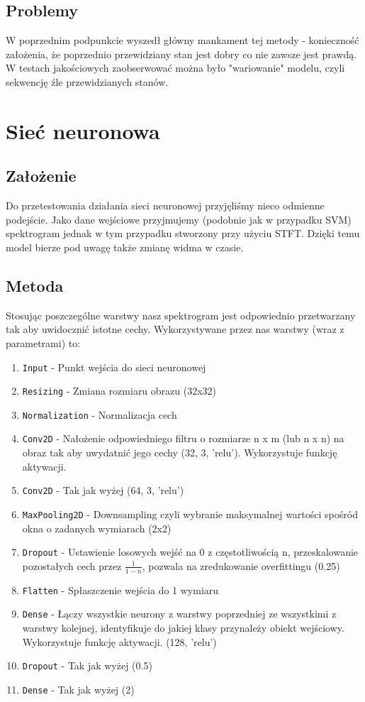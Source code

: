 \documentclass[polish]{article}
\begin{document}
\subsection{Problemy}
W poprzednim podpunkcie wyszedł główny mankament tej metody - konieczność założenia, że poprzednio
przewidziany stan jest dobry co nie zawsze jest prawdą. W testach jakościowych zaobserwować można było
"wariowanie" modelu, czyli sekwencję źle przewidzianych stanów.

\section{Sieć neuronowa}
\subsection{Założenie}
Do przetestowania działania sieci neuronowej przyjęliśmy nieco odmienne podejście. Jako dane wejściowe przyjmujemy (podobnie jak w przypadku SVM) spektrogram jednak w tym przypadku stworzony przy użyciu STFT. Dzięki temu model bierze pod uwagę także zmianę widma w czasie.
\subsection{Metoda}
Stosując poszczególne warstwy nasz spektrogram jest odpowiednio przetwarzany tak aby uwidocznić istotne cechy. Wykorzystywane przez nas warstwy (wraz z parametrami) to:
\begin{enumerate}
  \item\texttt{Input} - Punkt wejścia do sieci neuronowej
  \item\texttt{Resizing} - Zmiana rozmiaru obrazu (32x32)
  \item\texttt{Normalization} - Normalizacja cech
  \item\texttt{Conv2D} - Nałożenie odpowiedniego filtru o rozmiarze n x m (lub n x n) na obraz tak aby uwydatnić jego cechy (32, 3, 'relu'). Wykorzystuje funkcję aktywacji.
  \item\texttt{Conv2D} - Tak jak wyżej (64, 3, 'relu')
  \item\texttt{MaxPooling2D} - Downsampling czyli wybranie maksymalnej wartości spośród okna o zadanych wymiarach (2x2)
  \item\texttt{Dropout} - Ustawienie losowych wejść na 0 z częstotliwością n, przeskalowanie pozostałych cech przez 
  $\frac{1}{1-n}$, pozwala na zredukowanie overfittingu (0.25)
  \item\texttt{Flatten} - Spłaszczenie wejścia do 1 wymiaru
  \item\texttt{Dense} - Łączy wszystkie neurony z warstwy poprzedniej ze wszystkimi z warstwy kolejnej, identyfikuje do jakiej klasy przynależy obiekt wejściowy. Wykorzystuje funkcję aktywacji. (128, 'relu')
  \item\texttt{Dropout} - Tak jak wyżej (0.5)
  \item\texttt{Dense} - Tak jak wyżej (2)
\end{enumerate}
\end{document}
